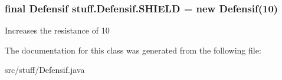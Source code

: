 \subsubsection[{\texorpdfstring{S\+H\+I\+E\+LD}{SHIELD}}]{\setlength{\rightskip}{0pt plus 5cm}final {\bf Defensif} stuff.\+Defensif.\+S\+H\+I\+E\+LD = new {\bf Defensif}(10)\hspace{0.3cm}{\ttfamily [static]}}\hypertarget{classstuff_1_1_defensif_abb7ed080847ab7471ae33d9eecb2a80f}{}\label{classstuff_1_1_defensif_abb7ed080847ab7471ae33d9eecb2a80f}
Increases the resistance of 10 

The documentation for this class was generated from the following file\+:\begin{DoxyCompactItemize}
\item 
src/stuff/Defensif.\+java\end{DoxyCompactItemize}

